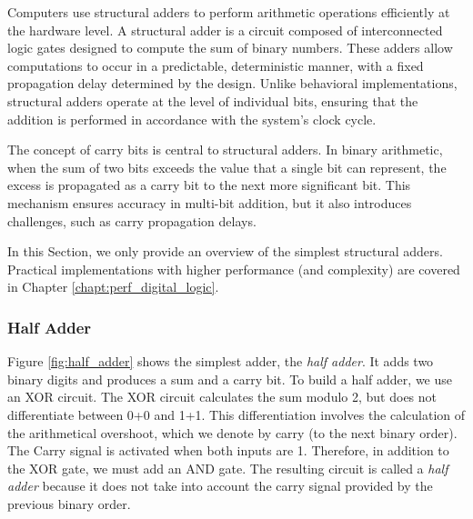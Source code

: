 Computers use structural adders to perform arithmetic operations efficiently at the hardware level. A structural adder is a circuit composed of interconnected logic gates designed to compute the sum of binary numbers. These adders allow computations to occur in a predictable, deterministic manner, with a fixed propagation delay determined by the design. Unlike behavioral implementations, structural adders operate at the level of individual bits, ensuring that the addition is performed in accordance with the system's clock cycle.

The concept of carry bits is central to structural adders. In binary arithmetic, when the sum of two bits exceeds the value that a single bit can represent, the excess is propagated as a carry bit to the next more significant bit. This mechanism ensures accuracy in multi-bit addition, but it also introduces challenges, such as carry propagation delays. 

In this Section, we only provide an overview of the simplest structural adders. Practical implementations with higher performance (and complexity) are covered in Chapter \ref{chapt:perf_digital_logic}.

\subsubsection{Half Adder}

Figure \ref{fig:half_adder} shows the simplest adder, the \textit{half adder}. It adds two binary digits and produces a sum and a carry bit. To build a half adder, we use an XOR circuit. The XOR circuit calculates the sum modulo 2, but does not differentiate between 0+0 and 1+1. This differentiation involves the calculation of the arithmetical overshoot, which we denote by carry (to the next binary order). The Carry signal is activated when both inputs are 1. Therefore, in addition to the XOR gate, we must add an AND gate. The resulting circuit is called a \textit{half adder} because it does not take into account the carry signal provided by the previous binary order.


